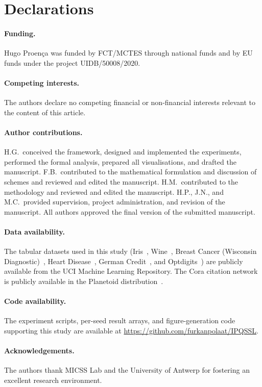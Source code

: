 \documentclass[11pt,a4paper]{article}
\begin{document}
\section*{Declarations}

\paragraph{Funding.}
Hugo Proen\c{c}a was funded by FCT/MCTES through national funds and by EU
funds under the project UIDB/50008/2020.

\paragraph{Competing interests.}
The authors declare no competing financial or non-financial interests
relevant to the content of this article.

\paragraph{Author contributions.}
 
H.G.\ conceived the framework, designed and implemented the experiments,
performed the formal analysis, prepared all visualisations, and drafted the
manuscript.
F.B.\ contributed to the mathematical formulation and discussion of schemes and reviewed
and edited the manuscript.
H.M.\ contributed to the methodology and reviewed and edited the
manuscript.
H.P., J.N., and M.C.\ provided supervision, project administration, and
revision of the manuscript.
All authors approved the final version of the submitted manuscript.

\paragraph{Data availability.}
The tabular datasets used in this study (Iris~\cite{fisher1988},
Wine~\cite{AeberhardForina1991Wine}, Breast Cancer (Wisconsin
Diagnostic)~\cite{wolberg1995breast}, Heart
Disease~\cite{misc_heart_disease_45}, German Credit~\cite{hofmann1994},
and Optdigits~\cite{alpaydin1998optdigits}) are publicly available from
the UCI Machine Learning Repository. The Cora citation
network~\cite{sen2008collective} is publicly available in the Planetoid
distribution~\cite{yang2016revisiting}.


\paragraph{Code availability.}
The experiment scripts, per-seed result arrays, and figure-generation
code supporting this study are available at
\url{https://github.com/furkanpolaat/IPQSSL}.

\paragraph{Acknowledgements.}
The authors thank MICSS Lab and the University of Antwerp for fostering an
excellent research environment.




\end{document}
